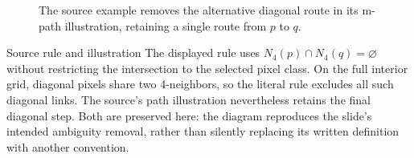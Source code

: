 \begin{figure}[!htbp]
\centering
{}
\caption{The source example removes the alternative diagonal route in its m-path illustration, retaining a single route from $p$ to $q$.}
\label{fig:connectivity-paths}
\end{figure}
\begin{remarkbox}{Source rule and illustration}
The displayed rule uses $N_4(p)\cap N_4(q)=\varnothing$ without restricting the intersection to the selected pixel class. On the full interior grid, diagonal pixels share two 4-neighbors, so the literal rule excludes all such diagonal links. The source's path illustration nevertheless retains the final diagonal step. Both are preserved here: the diagram reproduces the slide's intended ambiguity removal, rather than silently replacing its written definition with another convention.
\end{remarkbox}
